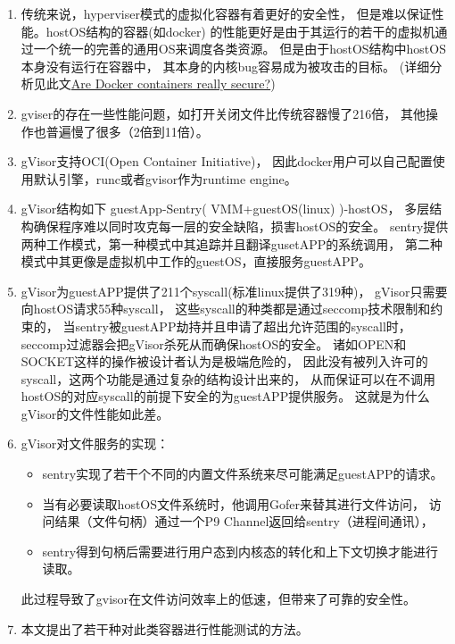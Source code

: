 \documentclass[AutoFakeBold,a4paper]{ctexart}
\begin{document}
\begin{enumerate}
    \item 传统来说，hyperviser模式的虚拟化容器有着更好的安全性，
    但是难以保证性能。hostOS结构的容器(如docker)
    的性能更好是由于其运行的若干的虚拟机通过一个统一的完善的通用OS来调度各类资源。
    但是由于hostOS结构中hostOS本身没有运行在容器中，
    其本身的内核bug容易成为被攻击的目标。 
    (详细分析见此文\href{https://opensource.com/business/14/7/docker-security-selinux}
    {Are Docker containers really secure?}\cite{DanielJDocker}) 
    
    \item gviser的存在一些性能问题，如打开关闭文件比传统容器慢了216倍，
    其他操作也普遍慢了很多（2倍到11倍）。
    \item gVisor支持OCI(Open Container Initiative)，
    因此docker用户可以自己配置使用默认引擎，runc或者gvisor作为runtime engine。
    \item gVisor结构如下 guestApp-Sentry( VMM+guestOS(linux) )-hostOS，
    多层结构确保程序难以同时攻克每一层的安全缺陷，损害hostOS的安全。
    sentry提供两种工作模式，第一种模式中其追踪并且翻译gusetAPP的系统调用，
    第二种模式中其更像是虚拟机中工作的guestOS，直接服务guestAPP。
    \item gVisor为guestAPP提供了211个syscall(标准linux提供了319种)，
    gVisor只需要向hostOS请求55种syscall，
    这些syscall的种类都是通过seccomp技术限制和约束的，
    当sentry被guestAPP劫持并且申请了超出允许范围的syscall时，
    seccomp过滤器会把gVisor杀死从而确保hostOS的安全。
    诸如OPEN和SOCKET这样的操作被设计者认为是极端危险的，
    因此没有被列入许可的syscall，这两个功能是通过复杂的结构设计出来的，
    从而保证可以在不调用hostOS的对应syscall的前提下安全的为guestAPP提供服务。
    这就是为什么gVisor的文件性能如此差。
    \item gVisor对文件服务的实现：
    \begin{itemize}
        \item sentry实现了若干个不同的内置文件系统来尽可能满足guestAPP的请求。
        \item 当有必要读取hostOS文件系统时，他调用Gofer来替其进行文件访问，
        访问结果（文件句柄）通过一个P9 Channel返回给sentry（进程间通讯），
        
        \item sentry得到句柄后需要进行用户态到内核态的转化和上下文切换才能进行读取。
    \end{itemize}
    此过程导致了gvisor在文件访问效率上的低速，但带来了可靠的安全性。
    
    \item 本文提出了若干种对此类容器进行性能测试的方法。
\end{enumerate}
\end{document}

